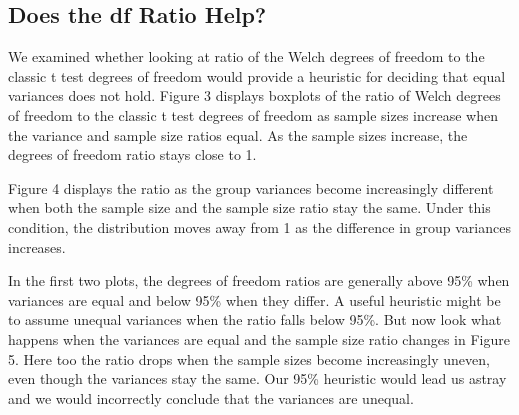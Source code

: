 \documentclass[man,a4paper,noextraspace]{apa6}\usepackage[]{graphicx}\usepackage[]{color}
\makeatletter
\newenvironment{kframe}{%
 \def\at@end@of@kframe{}%
 \ifinner\ifhmode%
  \def\at@end@of@kframe{\end{minipage}}%
  \begin{minipage}{\columnwidth}%
 \fi\fi%
 \def\FrameCommand##1{\hskip\@totalleftmargin \hskip-\fboxsep
 \colorbox{shadecolor}{##1}\hskip-\fboxsep
     \hskip-\linewidth \hskip-\@totalleftmargin \hskip\columnwidth}%
 \MakeFramed {\advance\hsize-\width
   \@totalleftmargin\z@ \linewidth\hsize
   \@setminipage}}%
 {\par\unskip\endMakeFramed%
 \at@end@of@kframe}
\newenvironment{knitrout}{}{} %
\makeatother
\begin{document}
\subsection{Does the df Ratio Help?}
    We examined whether looking at ratio of the Welch degrees of freedom to the classic t test degrees of freedom would provide a heuristic for deciding that equal variances does not hold. Figure 3 displays boxplots of the ratio of Welch degrees of freedom to the classic t test degrees of freedom as sample sizes increase when  the variance and sample size ratios equal. As the sample sizes increase, the degrees of freedom ratio stays close to 1. 

\begin{knitrout}
\color{fgcolor}\begin{kframe}


{\ttfamily\noindent\bfseries\color{errorcolor}{\#\# Error: stat\_boxplot requires the following missing aesthetics: y}}\end{kframe}
\end{knitrout}

    Figure 4 displays the ratio as the group variances become increasingly different when both the sample size and the sample size ratio stay the same. Under this condition, the distribution moves away from 1 as the difference in group variances increases.

\begin{knitrout}
\color{fgcolor}\begin{kframe}


{\ttfamily\noindent\bfseries\color{errorcolor}{\#\# Error: stat\_boxplot requires the following missing aesthetics: y}}\end{kframe}
\end{knitrout}

    In the first two plots, the degrees of freedom ratios are generally above 95\% when variances are equal and below 95\% when they differ. A useful heuristic might be to assume unequal variances when the ratio falls below 95\%. But now look what happens when the variances are equal and the sample size ratio changes in Figure 5. Here too the ratio drops when the sample sizes become increasingly uneven, even though the variances stay the same. Our 95\% heuristic would lead us astray and we would incorrectly conclude that the variances are unequal.

\begin{knitrout}
\color{fgcolor}\begin{kframe}


{\ttfamily\noindent\bfseries\color{errorcolor}{\#\# Error: stat\_boxplot requires the following missing aesthetics: y}}\end{kframe}
\end{knitrout}
\end{document}
